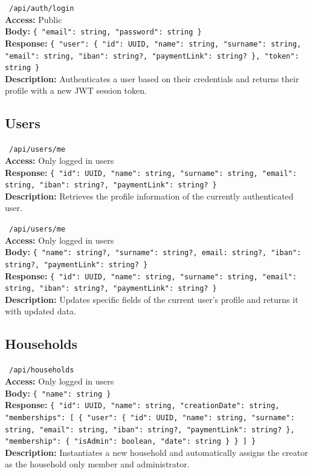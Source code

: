 \vspace{0.3cm}
\noindent \apiPOST\ \texttt{/api/auth/login} \\
\textbf{Access:} Public \\
\textbf{Body:} \texttt{\{ "email": string, "password": string \}} \\
\textbf{Response:} \texttt{\{ "user": \{ "id": UUID, "name": string, "surname": string, "email": string, "iban": string?, "paymentLink": string? \}, "token": string \}} \\
\textbf{Description:} Authenticates a user based on their credentials and returns their profile with a new JWT session token.

\subsection{Users}

\vspace{0.3cm}
\noindent \apiGET\ \texttt{/api/users/me} \\
\textbf{Access:} Only logged in users \\
\textbf{Response:} \texttt{\{ "id": UUID, "name": string, "surname": string, "email": string, "iban": string?, "paymentLink": string? \}} \\
\textbf{Description:} Retrieves the profile information of the currently authenticated user.

\vspace{0.3cm}
\noindent \apiPATCH\ \texttt{/api/users/me} \\
\textbf{Access:} Only logged in users \\
\textbf{Body:} \texttt{\{ "name": string?, "surname": string?, email: string?, "iban": string?, "paymentLink": string? \}} \\
\textbf{Response:} \texttt{\{ "id": UUID, "name": string, "surname": string, "email": string, "iban": string?, "paymentLink": string? \}} \\
\textbf{Description:} Updates specific fields of the current user's profile and returns it with updated data.

\subsection{Households}

\vspace{0.3cm}
\noindent \apiPOST\ \texttt{/api/households} \\
\textbf{Access:} Only logged in users \\
\textbf{Body:} \texttt{\{ "name": string \}} \\
\textbf{Response:} \texttt{\{ "id": UUID, "name": string, "creationDate": string, "memberships": [ \{ "user": \{ "id": UUID, "name": string, "surname": string, "email": string, "iban": string?, "paymentLink": string? \}, "membership": \{ "isAdmin": boolean, "date": string \} \} ] \}} \\
\textbf{Description:} Instantiates a new household and automatically assigns the creator as the household only member and administrator.

